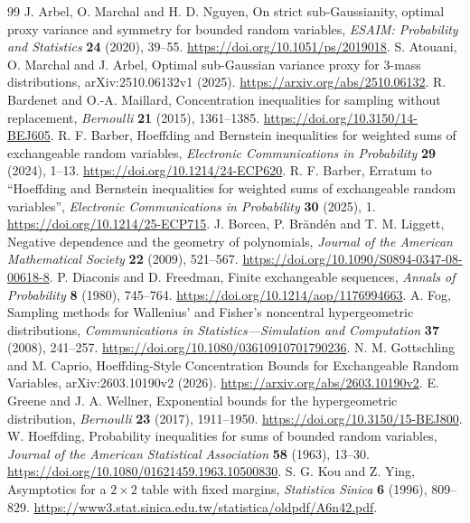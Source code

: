 \documentclass[11pt,a4paper]{article}
\begin{document}
\begin{thebibliography}{99}\setlength{\itemsep}{3pt}
 J. Arbel, O. Marchal and H. D. Nguyen, On strict sub-Gaussianity, optimal proxy variance and symmetry for bounded random variables, \emph{ESAIM: Probability and Statistics} \textbf{24} (2020), 39--55. \url{https://doi.org/10.1051/ps/2019018}.
 S. Atouani, O. Marchal and J. Arbel, Optimal sub-Gaussian variance proxy for 3-mass distributions, arXiv:2510.06132v1 (2025). \url{https://arxiv.org/abs/2510.06132}.
 R. Bardenet and O.-A. Maillard, Concentration inequalities for sampling without replacement, \emph{Bernoulli} \textbf{21} (2015), 1361--1385. \url{https://doi.org/10.3150/14-BEJ605}.
 R. F. Barber, Hoeffding and Bernstein inequalities for weighted sums of exchangeable random variables, \emph{Electronic Communications in Probability} \textbf{29} (2024), 1--13. \url{https://doi.org/10.1214/24-ECP620}.
 R. F. Barber, Erratum to ``Hoeffding and Bernstein inequalities for weighted sums of exchangeable random variables'', \emph{Electronic Communications in Probability} \textbf{30} (2025), 1. \url{https://doi.org/10.1214/25-ECP715}.
 J. Borcea, P. Br\"and\'en and T. M. Liggett, Negative dependence and the geometry of polynomials, \emph{Journal of the American Mathematical Society} \textbf{22} (2009), 521--567. \url{https://doi.org/10.1090/S0894-0347-08-00618-8}.
 P. Diaconis and D. Freedman, Finite exchangeable sequences, \emph{Annals of Probability} \textbf{8} (1980), 745--764. \url{https://doi.org/10.1214/aop/1176994663}.
 A. Fog, Sampling methods for Wallenius' and Fisher's noncentral hypergeometric distributions, \emph{Communications in Statistics---Simulation and Computation} \textbf{37} (2008), 241--257. \url{https://doi.org/10.1080/03610910701790236}.
 N. M. Gottschling and M. Caprio, Hoeffding-Style Concentration Bounds for Exchangeable Random Variables, arXiv:2603.10190v2 (2026). \url{https://arxiv.org/abs/2603.10190v2}.
 E. Greene and J. A. Wellner, Exponential bounds for the hypergeometric distribution, \emph{Bernoulli} \textbf{23} (2017), 1911--1950. \url{https://doi.org/10.3150/15-BEJ800}.
 W. Hoeffding, Probability inequalities for sums of bounded random variables, \emph{Journal of the American Statistical Association} \textbf{58} (1963), 13--30. \url{https://doi.org/10.1080/01621459.1963.10500830}.
 S. G. Kou and Z. Ying, Asymptotics for a $2\times2$ table with fixed margins, \emph{Statistica Sinica} \textbf{6} (1996), 809--829. \url{https://www3.stat.sinica.edu.tw/statistica/oldpdf/A6n42.pdf}.

\end{thebibliography}
\end{document}

